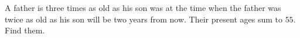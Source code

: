 A father is three times as old as his son was at the time when the father was twice as old as his son will be two years from now. Their present ages sum to $55$. Find them.
